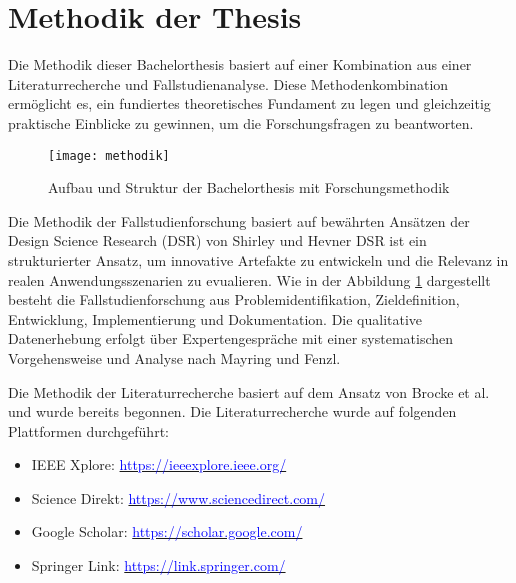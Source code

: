
\section{Methodik der Thesis}

Die Methodik dieser Bachelorthesis basiert auf einer Kombination aus einer Literaturrecherche und Fallstudienanalyse. Diese Methodenkombination ermöglicht es, ein fundiertes theoretisches Fundament zu legen und gleichzeitig praktische Einblicke zu gewinnen, um die Forschungsfragen zu beantworten.

\begin{figure}[H]
    \centering
    \caption{Aufbau und Struktur der Bachelorthesis mit Forschungsmethodik}
    \texttt{[image: methodik]}
    \captionsetup{font=scriptsize}
    \label{fig:methodik}
\end{figure}

Die Methodik der Fallstudienforschung basiert auf bewährten Ansätzen der Design Science Research (DSR) von Shirley und Hevner%
DSR ist ein strukturierter Ansatz, um innovative Artefakte zu entwickeln und die Relevanz in realen Anwendungsszenarien zu evualieren. Wie in der Abbildung \ref{fig:methodik} dargestellt besteht die Fallstudienforschung aus Problemidentifikation, Zieldefinition, Entwicklung, Implementierung und Dokumentation. Die qualitative Datenerhebung erfolgt über Expertengespräche mit einer systematischen Vorgehensweise und Analyse nach Mayring und Fenzl. %

Die Methodik der Literaturrecherche basiert auf dem Ansatz von Brocke et al. %
und wurde bereits begonnen. Die Literaturrecherche wurde auf folgenden Plattformen durchgeführt:

\begin{itemize}
    \item IEEE Xplore: \underline{\textcolor{blue}{https://ieeexplore.ieee.org/}}
    \item Science Direkt: \underline{\textcolor{blue}{https://www.sciencedirect.com/}}
    \item Google Scholar: \underline{\textcolor{blue}{https://scholar.google.com/}}
    \item Springer Link: \underline{\textcolor{blue}{https://link.springer.com/}}
\end{itemize}

